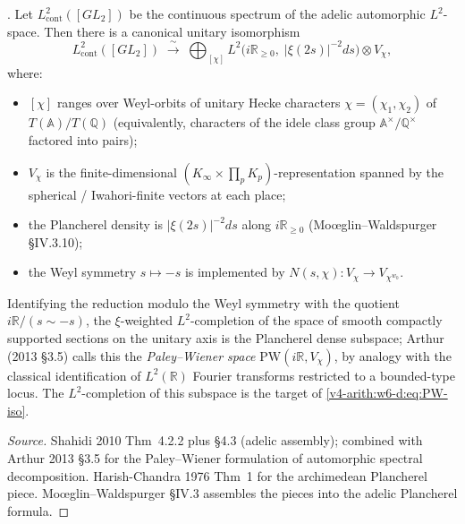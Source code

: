 \begin{theorem}
\label{v4-arith:w6-d:thm:PW-synthesis}
\ClaimStatusProvedElsewhere. Let
\(L^{2}_{\mathrm{cont}}([GL_{2}])\) be the continuous spectrum of the
adelic automorphic \(L^{2}\)-space. Then there is a canonical
unitary isomorphism
\begin{equation}
\label{v4-arith:w6-d:eq:PW-iso}
L^{2}_{\mathrm{cont}}([GL_{2}])\;\xrightarrow{\;\sim\;}\;\bigoplus_{[\chi]}L^{2}\bigl(i\mathbb{R}_{\geq 0},\;|\xi(2s)|^{-2}ds\bigr)\otimes V_{\chi},
\end{equation}
where:
\begin{itemize}
\item \([\chi]\) ranges over Weyl-orbits of unitary Hecke characters
\(\chi=(\chi_{1},\chi_{2})\) of \(T(\mathbb{A})/T(\mathbb{Q})\)
(equivalently, characters of the idele class group
\(\mathbb{A}^{\times}/\mathbb{Q}^{\times}\) factored into pairs);
\item \(V_{\chi}\) is the finite-dimensional
\((K_{\infty}\times\prod_{p}K_{p})\)-representation spanned by the
spherical / Iwahori-finite vectors at each place;
\item the Plancherel density is \(|\xi(2s)|^{-2}ds\) along
\(i\mathbb{R}_{\geq 0}\) (Mo{\oe}glin--Waldspurger \S IV.3.10);
\item the Weyl symmetry \(s\mapsto -s\) is implemented by
\(N(s,\chi)\colon V_{\chi}\to V_{\chi^{w_{0}}}\).
\end{itemize}
Identifying the reduction modulo the Weyl symmetry with the quotient
\(i\mathbb{R}/(s\sim -s)\), the \(\xi\)-weighted \(L^{2}\)-completion
of the space of smooth compactly supported sections on the unitary
axis is the Plancherel dense subspace; Arthur (2013 \S 3.5) calls this
the \emph{Paley--Wiener space} \(\mathrm{PW}(i\mathbb{R},V_{\chi})\),
by analogy with the classical identification of \(L^{2}(\mathbb{R})\)
Fourier transforms restricted to a bounded-type locus. The
\(L^{2}\)-completion of this subspace is the target of
\eqref{v4-arith:w6-d:eq:PW-iso}.
\end{theorem}

\begin{proof}[Source]
Shahidi 2010 Thm~4.2.2 plus \S 4.3 (adelic assembly); combined with
Arthur 2013 \S 3.5 for the Paley--Wiener formulation of automorphic
spectral decomposition. Harish-Chandra 1976 Thm~1 for the
archimedean Plancherel piece. Mo{\oe}glin--Waldspurger \S IV.3
assembles the pieces into the adelic Plancherel formula.
\end{proof}

